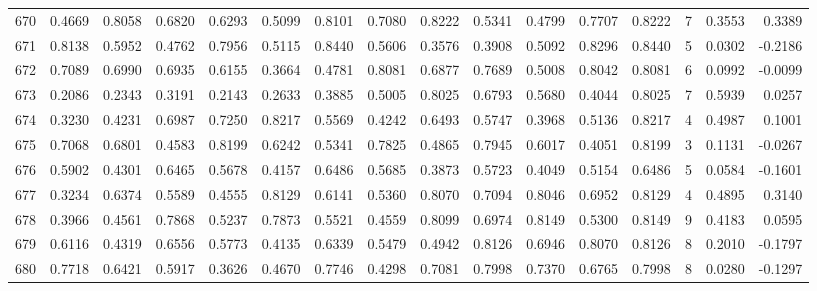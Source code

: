 \begin{tabular}{lrrrrrrrrrrrrrrr}
670 &      0.4669 &  0.8058 &  0.6820 &  0.6293 &  0.5099 &  0.8101 &  0.7080 &  0.8222 &  0.5341 &  0.4799 &   0.7707 &     0.8222 &      7 &                    0.3553 &                     0.3389 \\
671 &      0.8138 &  0.5952 &  0.4762 &  0.7956 &  0.5115 &  0.8440 &  0.5606 &  0.3576 &  0.3908 &  0.5092 &   0.8296 &     0.8440 &      5 &                    0.0302 &                    -0.2186 \\
672 &      0.7089 &  0.6990 &  0.6935 &  0.6155 &  0.3664 &  0.4781 &  0.8081 &  0.6877 &  0.7689 &  0.5008 &   0.8042 &     0.8081 &      6 &                    0.0992 &                    -0.0099 \\
673 &      0.2086 &  0.2343 &  0.3191 &  0.2143 &  0.2633 &  0.3885 &  0.5005 &  0.8025 &  0.6793 &  0.5680 &   0.4044 &     0.8025 &      7 &                    0.5939 &                     0.0257 \\
674 &      0.3230 &  0.4231 &  0.6987 &  0.7250 &  0.8217 &  0.5569 &  0.4242 &  0.6493 &  0.5747 &  0.3968 &   0.5136 &     0.8217 &      4 &                    0.4987 &                     0.1001 \\
675 &      0.7068 &  0.6801 &  0.4583 &  0.8199 &  0.6242 &  0.5341 &  0.7825 &  0.4865 &  0.7945 &  0.6017 &   0.4051 &     0.8199 &      3 &                    0.1131 &                    -0.0267 \\
676 &      0.5902 &  0.4301 &  0.6465 &  0.5678 &  0.4157 &  0.6486 &  0.5685 &  0.3873 &  0.5723 &  0.4049 &   0.5154 &     0.6486 &      5 &                    0.0584 &                    -0.1601 \\
677 &      0.3234 &  0.6374 &  0.5589 &  0.4555 &  0.8129 &  0.6141 &  0.5360 &  0.8070 &  0.7094 &  0.8046 &   0.6952 &     0.8129 &      4 &                    0.4895 &                     0.3140 \\
678 &      0.3966 &  0.4561 &  0.7868 &  0.5237 &  0.7873 &  0.5521 &  0.4559 &  0.8099 &  0.6974 &  0.8149 &   0.5300 &     0.8149 &      9 &                    0.4183 &                     0.0595 \\
679 &      0.6116 &  0.4319 &  0.6556 &  0.5773 &  0.4135 &  0.6339 &  0.5479 &  0.4942 &  0.8126 &  0.6946 &   0.8070 &     0.8126 &      8 &                    0.2010 &                    -0.1797 \\
680 &      0.7718 &  0.6421 &  0.5917 &  0.3626 &  0.4670 &  0.7746 &  0.4298 &  0.7081 &  0.7998 &  0.7370 &   0.6765 &     0.7998 &      8 &                    0.0280 &                    -0.1297 \\

\end{tabular}
